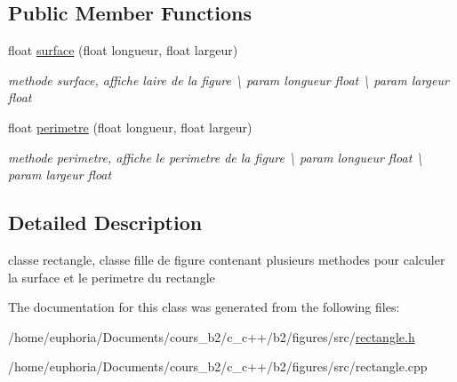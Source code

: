 \subsection*{Public Member Functions}
\begin{DoxyCompactItemize}
\item 
float \hyperlink{classrectangle_a7b881b0262d8e4ea913d188989399448}{surface} (float longueur, float largeur)\hypertarget{classrectangle_a7b881b0262d8e4ea913d188989399448}{}\label{classrectangle_a7b881b0262d8e4ea913d188989399448}

\begin{DoxyCompactList}\small\item\em methode surface, affiche l\textquotesingle{}aire de la figure \textbackslash{} param longueur float \textbackslash{} param largeur float \end{DoxyCompactList}\item 
float \hyperlink{classrectangle_a5720e82bd36ccfe8f17770523e3f033d}{perimetre} (float longueur, float largeur)\hypertarget{classrectangle_a5720e82bd36ccfe8f17770523e3f033d}{}\label{classrectangle_a5720e82bd36ccfe8f17770523e3f033d}

\begin{DoxyCompactList}\small\item\em methode perimetre, affiche le perimetre de la figure \textbackslash{} param longueur float \textbackslash{} param largeur float \end{DoxyCompactList}\end{DoxyCompactItemize}


\subsection{Detailed Description}
classe rectangle, classe fille de figure contenant plusieurs methodes pour calculer la surface et le perimetre du rectangle 

The documentation for this class was generated from the following files\+:\begin{DoxyCompactItemize}
\item 
/home/euphoria/\+Documents/cours\+\_\+b2/c\+\_\+c++/b2/figures/src/\hyperlink{rectangle_8h}{rectangle.\+h}\item 
/home/euphoria/\+Documents/cours\+\_\+b2/c\+\_\+c++/b2/figures/src/rectangle.\+cpp\end{DoxyCompactItemize}
